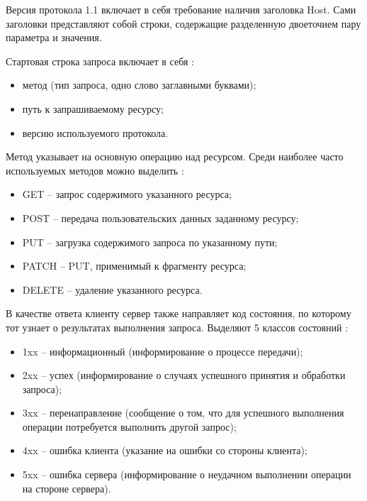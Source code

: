 Версия протокола 1.1 включает в себя требование наличия заголовка Host. Сами заголовки представляют собой строки, содержащие разделенную двоеточием пару параметра и значения. \cite{http11}

Стартовая строка запроса включает в себя \cite{http11}:
\begin{itemize}[leftmargin=1.6\parindent]
\item метод (тип запроса, одно слово заглавными буквами);
\item путь к запрашиваемому ресурсу;
\item версию используемого протокола.
\end{itemize}

Метод указывает на основную операцию над ресурсом. Среди наиболее часто используемых методов можно выделить \cite{http11}:
\begin{itemize}[leftmargin=1.6\parindent]
\item GET -- запрос содержимого указанного ресурса;
\item POST -- передача пользовательских данных заданному ресурсу;
\item PUT -- загрузка содержимого запроса по указанному пути;
\item PATCH -- PUT, применимый к фрагменту ресурса;
\item DELETE -- удаление указанного ресурса.
\end{itemize}

В качестве ответа клиенту сервер также направляет код состояния, по которому тот узнает о результатах выполнения запроса. Выделяют 5 классов состояний \cite{http11}:
\begin{itemize}[leftmargin=1.6\parindent]
\item 1xx -- информационный (информирование о процессе передачи);
\item 2xx -- успех (информирование о случаях успешного принятия и обработки запроса);
\item 3xx -- перенаправление (сообщение о том, что для успешного выполнения операции потребуется выполнить другой запрос);
\item 4xx -- ошибка клиента (указание на ошибки со стороны клиента);
\item 5xx -- ошибка сервера (информирование о неудачном выполнении операции на стороне сервера).
\end{itemize}


